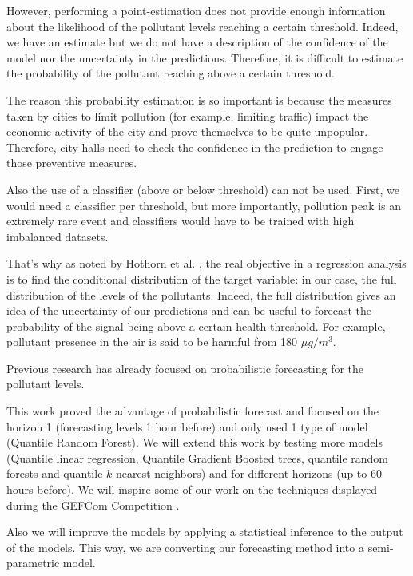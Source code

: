 \documentclass[a4paper,twocolumn,5p]{elsarticle}
\begin{document}
However, performing a point-estimation does not provide enough 
information about the likelihood of the pollutant levels 
reaching a certain 
threshold. Indeed, we have an estimate but we do not have a
description of the confidence of the model nor the uncertainty 
in the predictions. Therefore, it is difficult to estimate the 
probability of the pollutant reaching above a certain threshold.

The reason this probability estimation is so important is because 
the measures taken by cities to limit pollution (for example,
limiting traffic) impact the 
economic activity of the city and prove themselves to be quite
 unpopular. 
Therefore, city halls need to check the confidence in the 
prediction to engage those preventive measures.

Also the use of a classifier (above or below threshold) can not 
be used. First, we would need a classifier per threshold, but 
more importantly, pollution peak is an extremely rare event and 
classifiers would have to be trained with high imbalanced datasets.

That's why as noted by Hothorn et al. \cite{hothorn_conditional_2014},
the real objective in a regression analysis is to find the conditional
distribution of the target variable: in our case, the full 
distribution of the levels of the pollutants. Indeed, the full
distribution gives an idea of the uncertainty of our predictions and
can be useful to forecast the probability of the signal being above a
certain health threshold.  For example, \no pollutant presence in
the air is said to be harmful from 180 $\mu g / m^3$. 

Previous research \cite{proba_aznarte} has already focused on
probabilistic forecasting for the \no pollutant levels.

This work proved the advantage of probabilistic forecast and focused
on the horizon 1 (forecasting levels 1 hour before) and only used 1
type of model (Quantile Random Forest). We will extend this work by
testing more models (Quantile linear regression, Quantile Gradient 
Boosted
trees, quantile random forests and quantile $k$-nearest neighbors) 
and for different horizons (up to 60 hours
before).  We will inspire some of our work on the techniques displayed
during the GEFCom Competition \cite{mangalova_k-nearest_2016}
\cite{hong_probabilistic_2016}.

Also we will improve the models by applying a statistical
inference to the output of the models. This way, we are converting our
forecasting method into a semi-parametric model.
\end{document}
